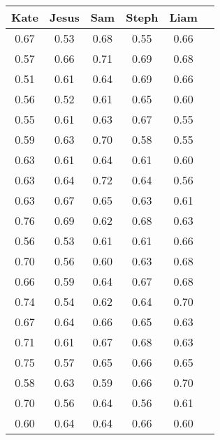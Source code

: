 \documentclass[11pt, letterpaper, includehead]{article}
\begin{document}
\begin{center}
  \begin{tabular}{|  c | c | c | c | c | c | }
    \hline
    \textbf{Kate} & \textbf{Jesus} & \textbf{Sam} & \textbf{Steph} & \textbf{Liam} \\
    \hline\hline
    0.67          & 0.53           & 0.68         & 0.55           & 0.66          \\
    \hline
    0.57          & 0.66           & 0.71         & 0.69           & 0.68          \\
    \hline
    0.51          & 0.61           & 0.64         & 0.69           & 0.66          \\
    \hline
    0.56          & 0.52           & 0.61         & 0.65           & 0.60          \\
    \hline
    0.55          & 0.61           & 0.63         & 0.67           & 0.55          \\
    \hline
    0.59          & 0.63           & 0.70         & 0.58           & 0.55          \\
    \hline
    0.63          & 0.61           & 0.64         & 0.61           & 0.60          \\
    \hline
    0.63          & 0.64           & 0.72         & 0.64           & 0.56          \\
    \hline
    0.63          & 0.67           & 0.65         & 0.63           & 0.61          \\
    \hline
    0.76          & 0.69           & 0.62         & 0.68           & 0.63          \\
    \hline
    0.56          & 0.53           & 0.61         & 0.61           & 0.66          \\
    \hline
    0.70          & 0.56           & 0.60         & 0.63           & 0.68          \\
    \hline
    0.66          & 0.59           & 0.64         & 0.67           & 0.68          \\
    \hline
    0.74          & 0.54           & 0.62         & 0.64           & 0.70          \\
    \hline
    0.67          & 0.64           & 0.66         & 0.65           & 0.63          \\
    \hline
    0.71          & 0.61           & 0.67         & 0.68           & 0.63          \\
    \hline
    0.75          & 0.57           & 0.65         & 0.66           & 0.65          \\
    \hline
    0.58          & 0.63           & 0.59         & 0.66           & 0.70          \\
    \hline
    0.70          & 0.56           & 0.64         & 0.56           & 0.61          \\
    \hline
    0.60          & 0.64           & 0.64         & 0.66           & 0.60          \\
    \hline
  \end{tabular}
\end{center}
\end{document}
